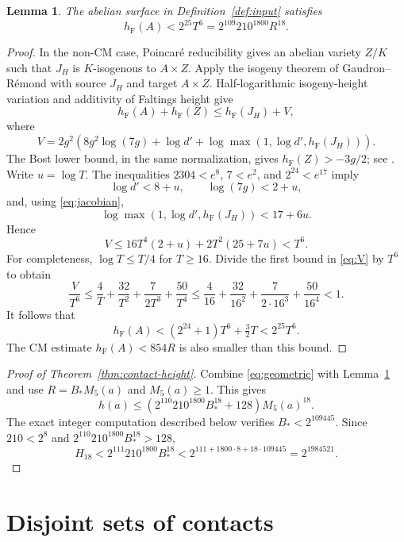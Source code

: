\documentclass[11pt,a4paper]{article}
\newtheorem{lemma}[theorem]{Lemma}
\theoremstyle{definition}
\newcommand{\hF}{h_{\mathrm F}}
\begin{document}
\begin{lemma}\label{lem:isogeny}
The abelian surface in Definition~\ref{def:input} satisfies
\[
 \hF(A)<2^{25}T^6=2^{109}210^{1800}R^{18}.
\]
\end{lemma}
\begin{proof}
In the non-CM case, Poincar\'e reducibility gives an abelian variety
$Z/K$ such that $J_H$ is $K$-isogenous to $A\times Z$.
Apply the isogeny theorem of Gaudron--R\'emond
\cite[Theorem~1.9(1), pp.~7--8]{GaudronRemond} with source $J_H$
and target $A\times Z$. Half-logarithmic isogeny-height variation
and additivity of Faltings height give
\[
 \hF(A)+\hF(Z)\le\hF(J_H)+V,
\]
where
\[
 V=2g^2\left(8g^2\log(7g)+\log d'
       +\log\max(1,\log d',\hF(J_H))\right).
\]
The Bost lower bound, in the same normalization, gives
$\hF(Z)>-3g/2$; see \cite[equation~(2.2)]{vonKaenel}.
Write $u=\log T$. The inequalities $2304<e^8$, $7<e^2$,
and $2^{24}<e^{17}$ imply
\[
 \log d'<8+u,\qquad \log(7g)<2+u,
\]
and, using \eqref{eq:jacobian},
\[
 \log\max(1,\log d',\hF(J_H))<17+6u.
\]
Hence
\begin{equation}\label{eq:V}
 V\le16T^4(2+u)+2T^2(25+7u)<T^6.
\end{equation}
For completeness, $\log T\le T/4$ for $T\ge16$. Divide the
first bound in \eqref{eq:V} by $T^6$ to obtain
\[
 \frac{V}{T^6}
 \le\frac4T+\frac{32}{T^2}+\frac{7}{2T^3}+\frac{50}{T^4}
 \le\frac4{16}+\frac{32}{16^2}
           +\frac7{2\cdot16^3}+\frac{50}{16^4}<1.
\]
It follows that
\[
 \hF(A)<(2^{24}+1)T^6+\tfrac32T<2^{25}T^6.
\]
The CM estimate $\hF(A)<854R$ is also smaller than this bound.
\end{proof}

\begin{proof}[Proof of Theorem~\ref{thm:contact-height}]
Combine \eqref{eq:geometric} with Lemma~\ref{lem:isogeny} and
use $R=B_*M_5(a)$ and $M_5(a)\ge1$. This gives
\[
 h(a)\le
 \left(2^{110}210^{1800}B_*^{18}+128\right)M_5(a)^{18}.
\]
The exact integer computation described below verifies
$B_*<2^{109445}$. Since $210<2^8$ and
$2^{110}210^{1800}B_*^{18}>128$,
\[
 H_{18}
 <2^{111}210^{1800}B_*^{18}
 <2^{111+1800\cdot8+18\cdot109445}
 =2^{1984521}.
\]
\end{proof}

\section{Disjoint sets of contacts}
\end{document}
